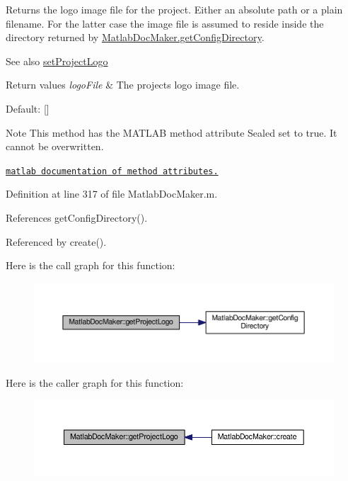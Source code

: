 Returns the logo image file for the project. Either an absolute path or a plain filename. For the latter case the image file is assumed to reside inside the directory returned by \hyperlink{class_matlab_doc_maker_a11a2a8ec616df969a911b325e39b0b4f}{Matlab\+Doc\+Maker.\+get\+Config\+Directory}. 

\begin{DoxySeeAlso}{See also}
\hyperlink{class_matlab_doc_maker_a6e84afe2189a851665133b6e7c412d4c}{set\+Project\+Logo}
\end{DoxySeeAlso}

\begin{DoxyRetVals}{Return values}
{\em logo\+File} & The projects logo image file. \\
\hline
\end{DoxyRetVals}
\begin{DoxyParagraph}{Default\+:}
\mbox{[}\mbox{]}
\end{DoxyParagraph}
\begin{DoxyNote}{Note}
This method has the M\+A\+T\+L\+AB method attribute {\ttfamily Sealed} set to true. It cannot be overwritten. 

\href{http://www.mathworks.com/help/matlab/matlab_oop/method-attributes.html}{\tt matlab documentation of method attributes.} 
\end{DoxyNote}


Definition at line 317 of file Matlab\+Doc\+Maker.\+m.



References get\+Config\+Directory().



Referenced by create().

Here is the call graph for this function\+:
\nopagebreak
\begin{figure}[H]
\begin{center}
\leavevmode
\includegraphics[width=350pt]{class_matlab_doc_maker_a6767085b13dc2600cb6beda7f7d6acd9_cgraph}
\end{center}
\end{figure}
Here is the caller graph for this function\+:
\nopagebreak
\begin{figure}[H]
\begin{center}
\leavevmode
\includegraphics[width=350pt]{class_matlab_doc_maker_a6767085b13dc2600cb6beda7f7d6acd9_icgraph}
\end{center}
\end{figure}
